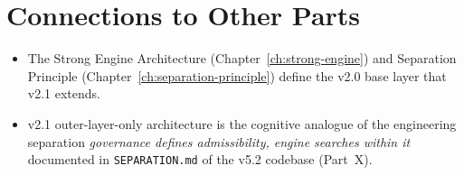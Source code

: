 \section*{Connections to Other Parts}

\begin{itemize}
\item The Strong Engine Architecture
(Chapter~\ref{ch:strong-engine}) and Separation Principle
(Chapter~\ref{ch:separation-principle}) define the v2.0 base layer
that v2.1 extends.
\item v2.1 outer-layer-only architecture is the cognitive analogue
of the engineering separation
\emph{governance defines admissibility, engine searches within it}
documented in
\texttt{SEPARATION.md} of the v5.2 codebase (Part~X).
\end{itemize}
